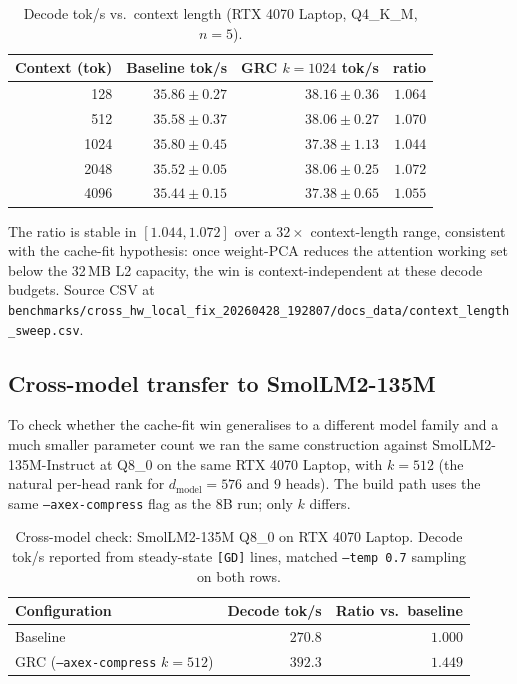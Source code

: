 \documentclass[11pt]{article}
\begin{document}
\begin{table}[h]\centering\footnotesize
\caption{Decode tok/s vs.\ context length (RTX 4070 Laptop, Q4\_K\_M, $n{=}5$).}
\label{tab:ctx-sweep}
\begin{tabular}{rrrr}
\toprule
Context (tok) & Baseline tok/s & GRC $k{=}1024$ tok/s & ratio \\
\midrule
128  & $35.86 \pm 0.27$  & $38.16 \pm 0.36$ & $1.064$ \\
512  & $35.58 \pm 0.37$  & $38.06 \pm 0.27$ & $1.070$ \\
1024 & $35.80 \pm 0.45$  & $37.38 \pm 1.13$ & $1.044$ \\
2048 & $35.52 \pm 0.05$  & $38.06 \pm 0.25$ & $1.072$ \\
4096 & $35.44 \pm 0.15$  & $37.38 \pm 0.65$ & $1.055$ \\
\bottomrule
\end{tabular}
\end{table}

The ratio is stable in $[1.044, 1.072]$ over a $32{\times}$ context-length
range, consistent with the cache-fit hypothesis: once weight-PCA reduces
the attention working set below the 32\,MB L2 capacity, the win is
context-independent at these decode budgets. Source CSV at
\texttt{benchmarks/cross\_hw\_local\_fix\_20260428\_192807/docs\_data/context\_length\_sweep.csv}.

\subsection{Cross-model transfer to SmolLM2-135M}
\label{sec:cross-model}

To check whether the cache-fit win generalises to a different model
family and a much smaller parameter count we ran the same construction
against SmolLM2-135M-Instruct at Q8\_0 on the same RTX 4070 Laptop, with
$k{=}512$ (the natural per-head rank for $d_\text{model}{=}576$ and $9$
heads). The build path uses the same \texttt{--axex-compress} flag as
the 8B run; only $k$ differs.

\begin{table}[h]\centering\footnotesize
\caption{Cross-model check: SmolLM2-135M Q8\_0 on RTX 4070 Laptop. Decode
tok/s reported from steady-state \texttt{[GD]} lines, matched
\texttt{--temp 0.7} sampling on both rows.}
\label{tab:cross-model}
\begin{tabular}{lrr}
\toprule
Configuration & Decode tok/s & Ratio vs.\ baseline \\
\midrule
Baseline                              & $270.8$ & $1.000$ \\
GRC (\texttt{--axex-compress} $k{=}512$) & $392.3$ & $1.449$ \\
\bottomrule
\end{tabular}
\end{table}
\end{document}
